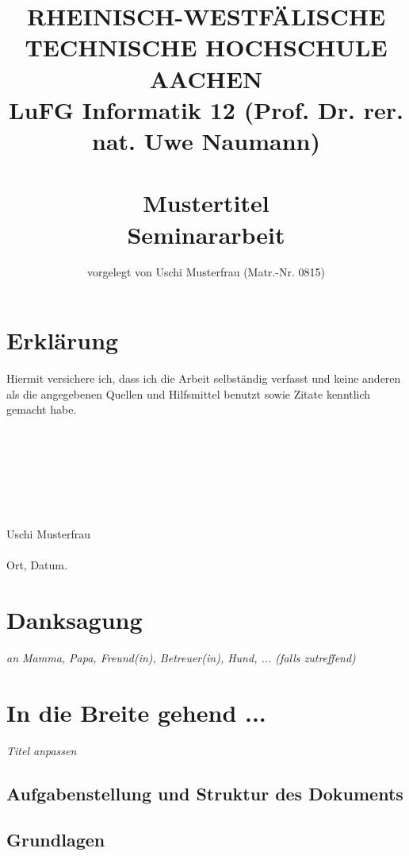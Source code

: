 \documentclass{article}
\title{
{\bf \scriptsize RHEINISCH-WESTF\"ALISCHE TECHNISCHE HOCHSCHULE AACHEN \\
LuFG Informatik 12 (Prof. Dr. rer. nat. Uwe Naumann)}
\vspace{.5cm} \\
\epsfig{file=figures/STCE_Logo_WWW.eps,width=.7\textwidth}
\vspace{1cm} \\
{\bf \Large Mustertitel} \\
{\large Seminararbeit} 
}
\author{vorgelegt von Uschi Musterfrau (Matr.-Nr. 0815)}
\begin{document}


\pagestyle{headings}

\maketitle
\newpage

\section*{Erkl\"arung}

Hiermit versichere ich, dass ich die Arbeit selbst\"andig verfasst und keine
anderen als die angegebenen Quellen und Hilfsmittel benutzt sowie Zitate 
kenntlich gemacht habe. \\
\\
\\
\\
\\
\\
\\
\\
Uschi Musterfrau \\
\\
Ort, Datum.

\newpage
\section*{Danksagung}

{\em an Mamma, Papa, Freund(in), Betreuer(in), Hund, ... (falls zutreffend)}

\newpage
\tableofcontents
\newpage

\section{In die Breite gehend ...}
\label{ch:2}

{\em Titel anpassen}


\subsection{Aufgabenstellung und Struktur des Dokuments}
\label{sec:2.0}

\subsection{Grundlagen}
\label{sec:2.1}
\end{document}
